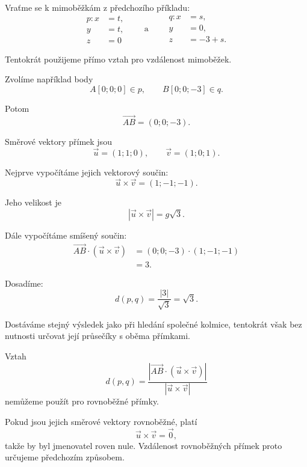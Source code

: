 \begin{example}
    \label{exa:Distance_skew_lines_space}

    Vraťme se k mimoběžkám z předchozího příkladu:
    \[
        \begin{aligned}
            p: x&=t,\\
            y&=t,\\
            z&=0
        \end{aligned}
        \qquad\text{a}\qquad
        \begin{aligned}
            q: x&=s,\\
            y&=0,\\
            z&=-3+s.
        \end{aligned}
    \]

    Tentokrát použijeme přímo vztah pro vzdálenost mimoběžek.

    Zvolíme například body
    \[
        A[0;0;0]\in p,
        \qquad
        B[0;0;-3]\in q.
    \]

    Potom
    \[
        \overrightarrow{AB}=(0;0;-3).
    \]

    Směrové vektory přímek jsou
    \[
        \vec{u}=(1;1;0),
        \qquad
        \vec{v}=(1;0;1).
    \]

    Nejprve vypočítáme jejich vektorový součin:
    \[
        \vec{u}\times\vec{v}
        =
        (1;-1;-1).
    \]

    Jeho velikost je
    \[
        |\vec{u}\times\vec{v}|
        =g
        \sqrt3.
    \]

    Dále vypočítáme smíšený součin:
    \begin{align*}
        \overrightarrow{AB}\cdot
        (\vec{u}\times\vec{v})
        &=
        (0;0;-3)\cdot(1;-1;-1)\\
        &=
        3.
    \end{align*}

    Dosadíme:
    \[
        d(p,q)
        =
        \frac{|3|}{\sqrt3}
        =
        \sqrt3.
    \]

    Dostáváme stejný výsledek jako při hledání společné kolmice,
    tentokrát však bez nutnosti určovat její průsečíky s oběma
    přímkami.
\end{example}

\begin{remark}
    Vztah
    \[
        d(p,q)
        =
        \frac{
            \left|
                \overrightarrow{AB}\cdot
                (\vec{u}\times\vec{v})
            \right|
        }{
            |\vec{u}\times\vec{v}|
        }
    \]
    nemůžeme použít pro rovnoběžné přímky.

    Pokud jsou jejich směrové vektory rovnoběžné, platí
    \[
        \vec{u}\times\vec{v}=\vec{0},
    \]
    takže by byl jmenovatel roven nule. Vzdálenost rovnoběžných
    přímek proto určujeme předchozím způsobem.
\end{remark}

